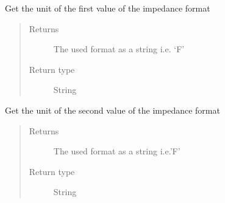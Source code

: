 \documentclass[letterpaper,10pt,english]{sphinxmanual}
\begin{document}
\begin{fulllineitems}
\begin{fulllineitems}
\begin{quote}
\begin{description}
\end{description}\end{quote}

\end{fulllineitems}


\begin{fulllineitems}
\label{\detokenize{index:TiePieLCR_settings.TiePieLCR_settings.get_impedance_format_unit1}}
\sphinxAtStartPar
Get the unit of the first value of the impedance format
\begin{quote}\begin{description}
\item[{Returns}] \leavevmode
\sphinxAtStartPar
The used format as a string i.e. ‘F’

\item[{Return type}] \leavevmode
\sphinxAtStartPar
String

\end{description}\end{quote}

\end{fulllineitems}


\begin{fulllineitems}
\label{\detokenize{index:TiePieLCR_settings.TiePieLCR_settings.get_impedance_format_unit2}}
\sphinxAtStartPar
Get the unit of the second value of the impedance format
\begin{quote}\begin{description}
\item[{Returns}] \leavevmode
\sphinxAtStartPar
The used format as a string i.e.’F’

\item[{Return type}] \leavevmode
\sphinxAtStartPar
String

\end{description}\end{quote}


\end{fulllineitems}
\end{fulllineitems}
\end{document}
